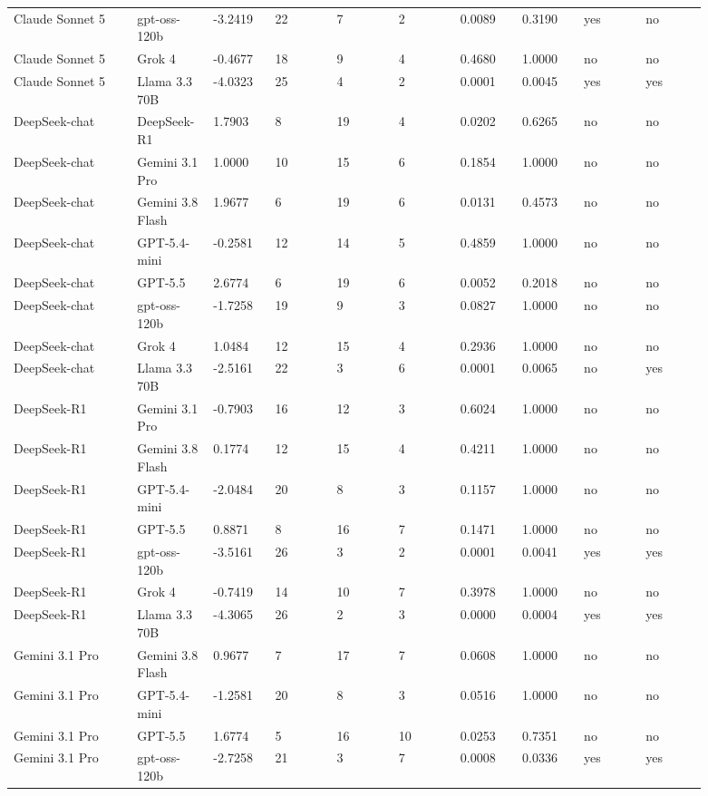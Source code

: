 \begin{landscape}
\begin{longtable}{p{0.162\linewidth}p{0.081\linewidth}p{0.081\linewidth}p{0.081\linewidth}p{0.081\linewidth}p{0.081\linewidth}p{0.081\linewidth}p{0.081\linewidth}p{0.081\linewidth}p{0.081\linewidth}}
Claude Sonnet 5 & gpt-oss-120b & -3.2419 & 22 & 7 & 2 & 0.0089 & 0.3190 & yes & no \\
Claude Sonnet 5 & Grok 4 & -0.4677 & 18 & 9 & 4 & 0.4680 & 1.0000 & no & no \\
Claude Sonnet 5 & Llama 3.3 70B & -4.0323 & 25 & 4 & 2 & 0.0001 & 0.0045 & yes & yes \\
DeepSeek-chat & DeepSeek-R1 & 1.7903 & 8 & 19 & 4 & 0.0202 & 0.6265 & no & no \\
DeepSeek-chat & Gemini 3.1 Pro & 1.0000 & 10 & 15 & 6 & 0.1854 & 1.0000 & no & no \\
DeepSeek-chat & Gemini 3.8 Flash & 1.9677 & 6 & 19 & 6 & 0.0131 & 0.4573 & no & no \\
DeepSeek-chat & GPT-5.4-mini & -0.2581 & 12 & 14 & 5 & 0.4859 & 1.0000 & no & no \\
DeepSeek-chat & GPT-5.5 & 2.6774 & 6 & 19 & 6 & 0.0052 & 0.2018 & no & no \\
DeepSeek-chat & gpt-oss-120b & -1.7258 & 19 & 9 & 3 & 0.0827 & 1.0000 & no & no \\
DeepSeek-chat & Grok 4 & 1.0484 & 12 & 15 & 4 & 0.2936 & 1.0000 & no & no \\
DeepSeek-chat & Llama 3.3 70B & -2.5161 & 22 & 3 & 6 & 0.0001 & 0.0065 & no & yes \\
DeepSeek-R1 & Gemini 3.1 Pro & -0.7903 & 16 & 12 & 3 & 0.6024 & 1.0000 & no & no \\
DeepSeek-R1 & Gemini 3.8 Flash & 0.1774 & 12 & 15 & 4 & 0.4211 & 1.0000 & no & no \\
DeepSeek-R1 & GPT-5.4-mini & -2.0484 & 20 & 8 & 3 & 0.1157 & 1.0000 & no & no \\
DeepSeek-R1 & GPT-5.5 & 0.8871 & 8 & 16 & 7 & 0.1471 & 1.0000 & no & no \\
DeepSeek-R1 & gpt-oss-120b & -3.5161 & 26 & 3 & 2 & 0.0001 & 0.0041 & yes & yes \\
DeepSeek-R1 & Grok 4 & -0.7419 & 14 & 10 & 7 & 0.3978 & 1.0000 & no & no \\
DeepSeek-R1 & Llama 3.3 70B & -4.3065 & 26 & 2 & 3 & 0.0000 & 0.0004 & yes & yes \\
Gemini 3.1 Pro & Gemini 3.8 Flash & 0.9677 & 7 & 17 & 7 & 0.0608 & 1.0000 & no & no \\
Gemini 3.1 Pro & GPT-5.4-mini & -1.2581 & 20 & 8 & 3 & 0.0516 & 1.0000 & no & no \\
Gemini 3.1 Pro & GPT-5.5 & 1.6774 & 5 & 16 & 10 & 0.0253 & 0.7351 & no & no \\
Gemini 3.1 Pro & gpt-oss-120b & -2.7258 & 21 & 3 & 7 & 0.0008 & 0.0336 & yes & yes \\

\end{longtable}
\end{landscape}

